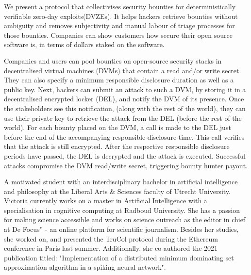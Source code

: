 \documentclass{article}
\begin{document}
We present a protocol that collectivises security bounties for deterministically verifiable zero-day exploits(DVZEs). It helps hackers retrieve bounties without ambiguity and removes subjectivity and manual labour of triage processes for those bounties. Companies can show customers how secure their open source software is, in terms of dollars staked on the software.

Companies and users can pool bounties on open-source security stacks in decentralised virtual machines (DVMs) that contain a read and/or write secret. They can also specify a minimum responsible disclosure duration as well as a public key. Next, hackers can submit an attack to such a DVM, by storing it in a decentralised encrypted locker (DEL), and notify the DVM of its presence. Once the stakeholders see this notification, (along with the rest of the world), they can use their private key to retrieve the attack from the DEL (before the rest of the world). For each bounty placed on the DVM, a call is made to the DEL just before the end of the accompanying responsible disclosure time. This call verifies that the attack is still encrypted. After the respective responsible disclosure periods have passed, the DEL is decrypted and the attack is executed. Successful attacks compromise the DVM read/write secret, triggering bounty hunter payout.


A motivated student with an interdisciplinary bachelor in artificial intelligence and philosophy at the Liberal Arts & Sciences faculty of Utrecht University. Victoria currently works on a master in Artificial Intelligence with a specialisation in cognitive computing at Radboud University. She has a passion for making science accessible and works on science outreach as the editor in chief at De Focus” - an online platform for scientific journalism. Besides her studies, she worked on, and presented the TruCol protocol during the Ethereum conference in Paris last summer. Additionally, she co-authored the 2021 publication titled: "Implementation of a distributed minimum dominating set approximation algorithm in a spiking neural network".
\end{document}
